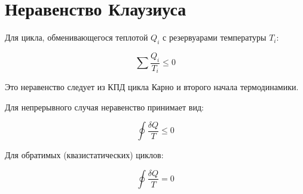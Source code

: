 \documentclass[12pt]{article}
\begin{document}
\section*{Неравенство Клаузиуса}

Для цикла, обменивающегося теплотой $Q_i$ с резервуарами температуры $T_i$:

\[\sum\frac{Q_i}{T_i}\le0\]

Это неравенство следует из КПД цикла Карно и второго начала термодинамики.

Для непрерывного случая неравенство принимает вид:

\[\oint\frac{\delta Q}{T}\le0\]

Для обратимых (квазистатических) циклов:

\[\oint\frac{\delta Q}{T}=0\]
\end{document}
